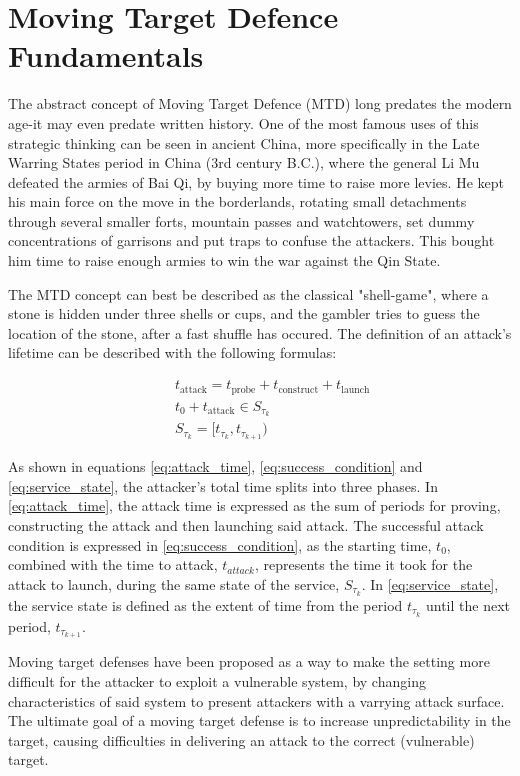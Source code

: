 \section{Moving Target Defence Fundamentals}
The abstract concept of Moving Target Defence (MTD) long predates the modern age-it may even predate written history. One of the most famous uses of this strategic thinking can be seen in ancient China\cite{sawyer2002}, more specifically in the Late Warring States period in China (3rd century B.C.), where the general Li Mu defeated the armies of Bai Qi, by buying more time to raise more levies. He kept his main force on the move in the borderlands, rotating small detachments through several smaller forts, mountain passes and watchtowers, set dummy concentrations of garrisons and put traps to confuse the attackers. This bought him time to raise enough armies to win the war against the Qin State. 

The MTD concept can best be described as the classical "shell-game", where a stone is hidden under three shells or cups, and the gambler tries to guess the location of the stone, after a fast shuffle has occured. The definition of an attack's lifetime can be described with the following formulas:

\begin{align}
\quad & t_{\text{attack}} = t_{\text{probe}} + t_{\text{construct}} + t_{\text{launch}} \label{eq:attack_time} \\
\quad & t_0 + t_{\text{attack}} \in S_{\tau_k} \label{eq:success_condition} \\
\quad & S_{\tau_k} = [t_{\tau_k}, t_{\tau_{k+1}}) \label{eq:service_state}
\end{align}

As shown in equations \ref{eq:attack_time}, \ref{eq:success_condition} and \ref{eq:service_state}\cite{vladescu2025}, the attacker's total time splits into three phases. In \autoref{eq:attack_time}, the attack time is expressed as the sum of periods for proving, constructing the attack and then launching said attack. The successful attack condition is expressed in \autoref{eq:success_condition}, as the starting time, $t_0$, combined with the time to attack, $t_{attack}$, represents the time it took for the attack to launch, during the same state of the service, $S_{\tau_k}$. In \autoref{eq:service_state}, the service state is defined as the extent of time from the period $t_{\tau_k}$ until the next period, $t_{\tau_{k+1}}$.

Moving target defenses have been proposed as a way to make the setting more difficult for the attacker to exploit a vulnerable system, by changing characteristics of said system to present attackers with a varrying attack surface\cite{mtd_vol1}. The ultimate goal of a moving target defense is to increase unpredictability in the target, causing difficulties in delivering an attack to the correct (vulnerable) target.

